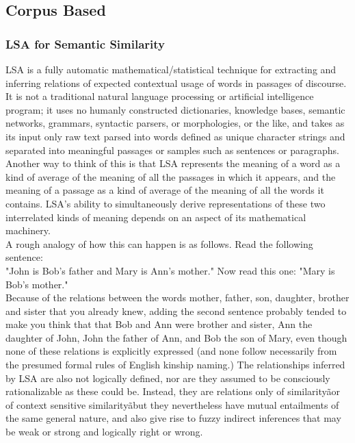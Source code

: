\subsection{Corpus Based}
\label {corpus}
\subsubsection{LSA for Semantic Similarity}
LSA is a fully automatic mathematical/statistical technique for extracting and inferring relations of expected contextual usage of words in passages of discourse. It is not a traditional natural language processing or artificial intelligence program; it uses no humanly constructed dictionaries, knowledge bases, semantic networks, grammars, syntactic parsers, or morphologies, or the like, and takes as its input only raw text parsed into words defined as unique character strings and separated into meaningful passages or samples such as sentences or paragraphs.
Another way to think of this is that LSA represents the meaning of a word as a kind of average of the meaning of all the passages in which it appears, and the meaning of a passage as a kind of average of the meaning of all the words it contains. LSA's ability to simultaneously derive representations of these two interrelated kinds of meaning depends on an aspect of its mathematical machinery.\\

A rough analogy of how this can happen is as follows. Read the following sentence:\\
"John is Bob's father and Mary is Ann's mother." Now read this one: "Mary is Bob's mother."\\
Because of the relations between the words mother, father, son, daughter, brother and sister that you already knew, adding the second sentence probably tended to make you think that that Bob and Ann were brother and sister, Ann the daughter of John, John the father of Ann, and Bob the son of Mary, even though none of these relations is explicitly expressed (and none follow necessarily from the presumed formal rules of English kinship naming.) The relationships inferred by LSA are also not logically defined, nor are they assumed to be consciously rationalizable as these could be. Instead, they are relations only of similarityãor of context sensitive similarityãbut they nevertheless have mutual entailments of the same general nature, and also give rise to fuzzy indirect inferences that may be weak or strong and logically right or wrong\citep{lsa}.

